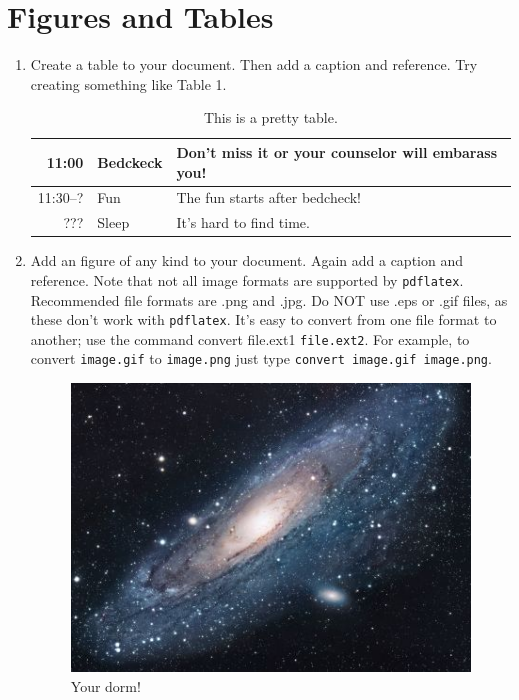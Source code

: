 \documentclass[12pt, a4paper]{article}
\begin{document}
    \section{Figures and Tables}
    \begin{enumerate}
        \item Create a table to your document. Then add a caption and reference. Try creating something like Table 1.
       
            \begin{table}[h]
                \begin{center}
                    \begin{tabular}{ |r |l| l| }
                        \hline
                     11:00 & Bedckeck & Don’t miss it or your counselor will embarass you!  \\ \hline
                     11:30–? & Fun & The fun starts after bedcheck! \\ \hline
                     ??? & Sleep & It’s hard to find time. \\ \hline
            
                    \end{tabular}
          
                    \caption{This is a pretty table.}
          
                 \end{center}
           
         
             \end{table}
    
       
        \item  Add an figure of any kind to your document. Again add a caption and reference. Note that not all image formats are supported by \texttt{pdflatex}. Recommended ﬁle formats are .png and .jpg. Do NOT use .eps or .gif ﬁles, as these don’t work with \texttt{pdflatex}. It’s easy to convert from one ﬁle format to another; use the command convert file.ext1 \texttt{file.ext2}. For example, to convert \texttt{image.gif} to \texttt{image.png} just type \texttt{convert image.gif image.png}.
        
       \begin{figure}[h]
            \centering
            \includegraphics[scale=3]{universe}
            \caption {Your dorm!}
        \end{figure}
    
    \end{enumerate}
    \newpage
\end{document}
